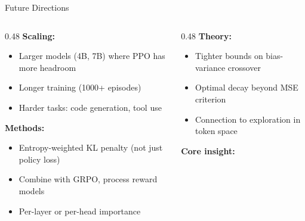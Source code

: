 \documentclass[aspectratio=169,10pt]{beamer}
\begin{document}
\begin{frame}{Future Directions}

\begin{columns}
\begin{column}{0.48\textwidth}
\textbf{Scaling:}
\begin{itemize}
    \item Larger models (4B, 7B) where PPO has more headroom
    \item Longer training (1000+ episodes)
    \item Harder tasks: code generation, tool use
\end{itemize}

\vspace{0.3cm}
\textbf{Methods:}
\begin{itemize}
    \item Entropy-weighted KL penalty (not just policy loss)
    \item Combine with GRPO, process reward models
    \item Per-layer or per-head importance
\end{itemize}
\end{column}
\begin{column}{0.48\textwidth}
\textbf{Theory:}
\begin{itemize}
    \item Tighter bounds on bias-variance crossover
    \item Optimal decay beyond MSE criterion
    \item Connection to exploration in token space
\end{itemize}

\vspace{0.3cm}
\textbf{Core insight:}

\begin{center}
\end{center}
\end{column}
\end{columns}

\end{frame}
\end{document}
